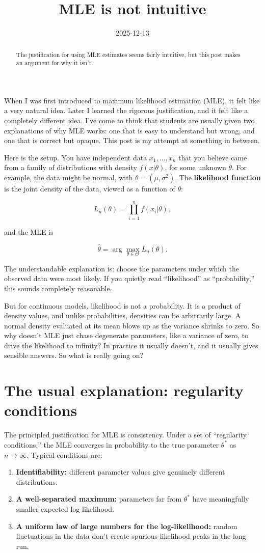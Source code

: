 \documentclass{article}
\title{MLE is not intuitive}
\date{2025-12-13}
\begin{document}
\begin{abstract}
The justification for using MLE estimates seems fairly intuitive, but this post makes an argument for why it isn't.
\end{abstract}

When I was first introduced to maximum likelihood estimation (MLE), it felt like a very natural idea. Later I learned the rigorous justification, and it felt like a completely different idea. I've come to think that students are usually given two explanations of why MLE works: one that is easy to understand but wrong, and one that is correct but opaque. This post is my attempt at something in between.

Here is the setup. You have independent data $x_1, \dots, x_n$ that you believe came from a family of distributions with density $f(x|\theta)$, for some unknown $\theta$. For example, the data might be normal, with $\theta = (\mu, \sigma^2)$. The \textbf{likelihood function} is the joint density of the data, viewed as a function of $\theta$:

\[L_n(\theta) = \prod_{i=1}^n f(x_i|\theta),\]

and the MLE is

\[\hat\theta = \arg\max_{\theta \in \Theta} L_n(\theta).\]

The understandable explanation is: choose the parameters under which the observed data were most likely. If you quietly read ``likelihood'' as ``probability,'' this sounds completely reasonable.

But for continuous models, likelihood is not a probability. It is a product of density values, and unlike probabilities, densities can be arbitrarily large. A normal density evaluated at its mean blows up as the variance shrinks to zero. So why doesn't MLE just chase degenerate parameters, like a variance of zero, to drive the likelihood to infinity? In practice it usually doesn't, and it usually gives sensible answers. So what is really going on?

\section{The usual explanation: regularity conditions}

The principled justification for MLE is consistency. Under a set of ``regularity conditions,'' the MLE converges in probability to the true parameter $\theta^*$ as $n \to \infty$. Typical conditions are:

\begin{enumerate}
\item \textbf{Identifiability:} different parameter values give genuinely different distributions.
\item \textbf{A well-separated maximum:} parameters far from $\theta^*$ have meaningfully smaller expected log-likelihood.
\item \textbf{A uniform law of large numbers for the log-likelihood:} random fluctuations in the data don't create spurious likelihood peaks in the long run.
\end{enumerate}
\end{document}
